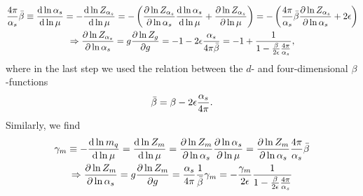 \begin{equation}
\begin{gathered}
\frac{4\pi}{\alpha_s} \bar{\beta} \equiv \frac{\mathrm{d} \ln \alpha_s}{\mathrm{d} \ln \mu} = - \frac{\mathrm{d} \ln Z_{\alpha_s}}{\mathrm{d} \ln \mu} = - \left( \frac{\partial \ln Z_{\alpha_s}}{\partial \ln \alpha_s} \frac{\mathrm{d} \ln \alpha_s}{\mathrm{d} \ln \mu} + \frac{\partial \ln Z_{\alpha_s}}{\partial \ln\mu} \right) = - \left(  \frac{4 \pi}{\alpha_s}\bar{\beta} \frac{\partial \ln Z_{\alpha_s}}{\partial \ln \alpha_s} + 2 \epsilon \right) \\
\Rightarrow \frac{\partial \ln Z_{\alpha_s}}{\partial \ln \alpha_s} = g \frac{\partial \ln Z_g}{\partial g} = - 1 - 2 \epsilon \frac{\alpha_s}{4 \pi\bar{\beta}} = -1 + \frac{1}{1 - \frac{\beta}{2 \epsilon} \frac{4 \pi}{\alpha_s}},
\end{gathered}
\end{equation}
where in the last step we used the relation between the $d$- and four-dimensional $\beta$-functions
\begin{equation}
\bar{\beta} = \beta - 2 \epsilon \frac{\alpha_s}{4 \pi}.
\label{eq:4:d_dimensional_beta_function}
\end{equation}
Similarly, we find
\begin{equation}
\begin{gathered}
\gamma_m \equiv - \frac{\mathrm{d} \ln m_q}{\mathrm{d} \ln \mu} = \frac{\mathrm{d} \ln Z_m}{\mathrm{d} \ln \mu} = \frac{\partial \ln Z_m}{\partial \ln \alpha_s} \frac{\partial \ln \alpha_s}{\partial \ln \mu} = \frac{\partial \ln Z_m}{\partial \ln \alpha_s} \frac{4 \pi}{\alpha_s} \bar{\beta} \\
\Rightarrow \frac{\partial \ln Z_m}{ \partial \ln \alpha_s} = g \frac{\partial \ln Z_m}{\partial g} = \frac{\alpha_s}{4 \pi} \frac{1}{\bar{\beta}} \gamma_m = - \frac{\gamma_m}{2 \epsilon} \frac{1}{1 - \frac{\beta}{2 \epsilon} \frac{4 \pi}{\alpha_s}}
\end{gathered}
\end{equation}

